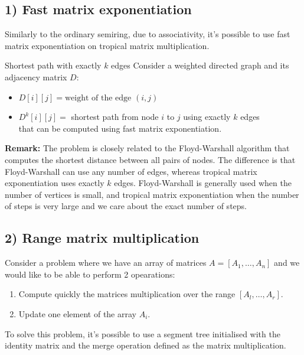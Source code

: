 \documentclass{article}
\begin{document}
\subsection*{1) Fast matrix exponentiation}

Similarly to the ordinary semiring, due to associativity, it's possible to use fast matrix exponentiation on tropical matrix multiplication.

\begin{myexample}{Shortest path with exactly $k$ edges}
Consider a weighted directed graph and its adjacency matrix $D$:
\begin{itemize}
    \item $D[i][j] = \text{weight of the edge } (i,j)$
\item $D^k[i][j] =$ shortest path from node $i$ to $j$ using exactly $k$ edges \\
that can be computed using fast matrix exponentiation.
\end{itemize}
\end{myexample}

\textbf{Remark: } The problem is closely related to the Floyd-Warshall algorithm that computes the shortest distance between all pairs of nodes. The difference is that Floyd-Warshall can use any number of edges, whereas tropical matrix exponentiation uses exactly $k$ edges. Floyd-Warshall is generally used when the number of vertices is small, and tropical matrix exponentiation when the number of steps is very large and we care about the exact number of steps.

\subsection*{2) Range matrix multiplication}

Consider a problem where we have an array of matrices $A = [A_1, \dots, A_n]$ and we would like to be able to perform 2 opearations:

\begin{enumerate}
    \item Compute quickly the matrices multiplication over the range $[A_l, \dots, A_r]$.
    \item Update one element of the array $A_i$.
\end{enumerate}

To solve this problem, it's possible to use a segment tree initialised with the identity matrix and the merge operation defined as the matrix multiplication.
\end{document}
